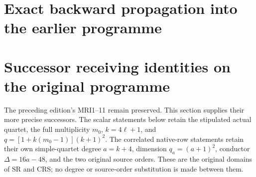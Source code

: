 \endgroup

\clearpage
\begingroup


\setcounter{equation}{0}
\renewcommand{\theequation}{A02ARU.\arabic{equation}}
\section*{Exact backward propagation into the earlier programme}
\section{Successor receiving identities on the original programme}

The preceding edition's MRI1--11 remain preserved. This section supplies
their more precise successors. The scalar statements below retain the
stipulated actual quartet, the full multiplicity $m_0$, $k=4\ell+1$, and
$q=[1+k(m_0-1)](k+1)^2$. The correlated native-row statements retain their
own simple-quartet degree $a=k+4$, dimension $q_a=(a+1)^2$, conductor
$\Delta=16a-48$, and the two original source orders. These are the
original domains of SR and CRS; no degree or source-order substitution
is made between them.

